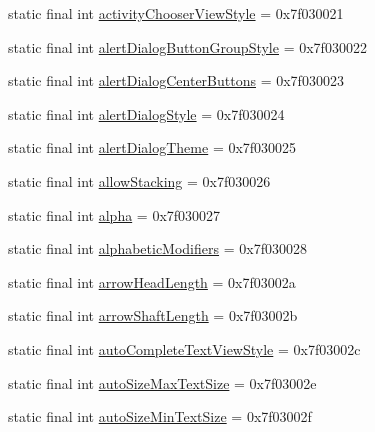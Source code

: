 \begin{DoxyCompactItemize}
static final int \mbox{\hyperlink{classandroid_1_1support_1_1v7_1_1appcompat_1_1_r_1_1attr_a99ee319f70da8f853398a976e8aa77f1}{activity\+Chooser\+View\+Style}} = 0x7f030021
\item 
static final int \mbox{\hyperlink{classandroid_1_1support_1_1v7_1_1appcompat_1_1_r_1_1attr_a9cd8a90d273c546b9fbc041fdaef713d}{alert\+Dialog\+Button\+Group\+Style}} = 0x7f030022
\item 
static final int \mbox{\hyperlink{classandroid_1_1support_1_1v7_1_1appcompat_1_1_r_1_1attr_afe960e6e9a8005c0227208863d89c130}{alert\+Dialog\+Center\+Buttons}} = 0x7f030023
\item 
static final int \mbox{\hyperlink{classandroid_1_1support_1_1v7_1_1appcompat_1_1_r_1_1attr_a10699ad87a0819a6ab3fc99c1105e45b}{alert\+Dialog\+Style}} = 0x7f030024
\item 
static final int \mbox{\hyperlink{classandroid_1_1support_1_1v7_1_1appcompat_1_1_r_1_1attr_a28f6a386e132437d00548463893aef86}{alert\+Dialog\+Theme}} = 0x7f030025
\item 
static final int \mbox{\hyperlink{classandroid_1_1support_1_1v7_1_1appcompat_1_1_r_1_1attr_a6373691f67700e6c61a4bf5238fee215}{allow\+Stacking}} = 0x7f030026
\item 
static final int \mbox{\hyperlink{classandroid_1_1support_1_1v7_1_1appcompat_1_1_r_1_1attr_a7a191c05c7dd29304dfbbd27a8fd68a9}{alpha}} = 0x7f030027
\item 
static final int \mbox{\hyperlink{classandroid_1_1support_1_1v7_1_1appcompat_1_1_r_1_1attr_acb4014e1527ac9a51a7f3e1ad3c3676b}{alphabetic\+Modifiers}} = 0x7f030028
\item 
static final int \mbox{\hyperlink{classandroid_1_1support_1_1v7_1_1appcompat_1_1_r_1_1attr_ada826d1f4aa2ea746c1abd4f99eb1df5}{arrow\+Head\+Length}} = 0x7f03002a
\item 
static final int \mbox{\hyperlink{classandroid_1_1support_1_1v7_1_1appcompat_1_1_r_1_1attr_ace00a2bee9d85338c3b35617f5b80946}{arrow\+Shaft\+Length}} = 0x7f03002b
\item 
static final int \mbox{\hyperlink{classandroid_1_1support_1_1v7_1_1appcompat_1_1_r_1_1attr_ad5da727bf9b68654cd19ab7222a504a1}{auto\+Complete\+Text\+View\+Style}} = 0x7f03002c
\item 
static final int \mbox{\hyperlink{classandroid_1_1support_1_1v7_1_1appcompat_1_1_r_1_1attr_a26f6b54ff86deaeb5fd5ca764146d7cd}{auto\+Size\+Max\+Text\+Size}} = 0x7f03002e
\item 
static final int \mbox{\hyperlink{classandroid_1_1support_1_1v7_1_1appcompat_1_1_r_1_1attr_a2c527ce5b2661a5be141946033343826}{auto\+Size\+Min\+Text\+Size}} = 0x7f03002f

\end{DoxyCompactItemize}
